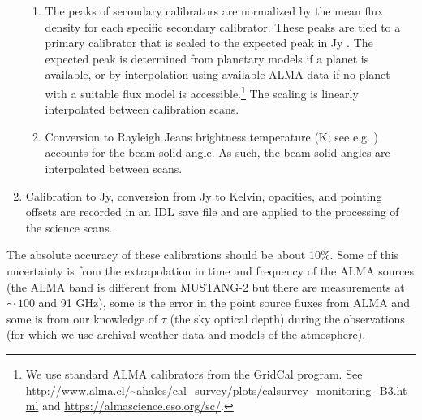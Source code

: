 \documentclass[twocolumn]{aastex62}
\def\todo#1{{\textcolor{red}{TODO: #1}}}
\newcommand{\MUSTANG}{MUSTANG-2\xspace}
\begin{document}
\begin{enumerate}
        \begin{enumerate}
            \item The peaks of secondary calibrators are normalized by the mean flux density
                for each specific secondary calibrator. These peaks are tied
                to a primary calibrator that is scaled to the expected
                peak in Jy \perbeam.  The expected peak is determined from
                planetary models if a planet is available, or by interpolation
                using available ALMA data \citep{vanKempen2014a,Fomalont2014a}
                if no planet with a suitable flux model is accessible.\footnote{We use
                standard ALMA calibrators from the GridCal program.  See
                \url{http://www.alma.cl/~ahales/cal_survey/plots/calsurvey_monitoring_B3.html} and 
                \url{https://almascience.eso.org/sc/}.}
                The scaling is
                linearly interpolated between calibration scans.
            \item Conversion to Rayleigh Jeans brightness temperature (K; see e.g. \citealt{Condon2016a}) accounts for the beam solid angle. As such,
                the beam solid angles are interpolated between scans.
        \end{enumerate}
    \item Calibration to Jy, conversion from Jy \perbeam to Kelvin, opacities,
        and pointing offsets are recorded in an IDL save file and are
        applied to the processing of the science scans.
\end{enumerate}

The absolute accuracy of these calibrations should be about 10\%.
Some of this uncertainty is from the extrapolation in time and frequency of the ALMA
sources (the ALMA band is different from \MUSTANG but there are measurements at
$\sim~100$ and 91 GHz), some is the error in the point source fluxes from ALMA and
some is from our knowledge of $\tau$ (the sky optical depth) during the observations (for which we use archival weather data and models of the atmosphere). 
\end{document}
